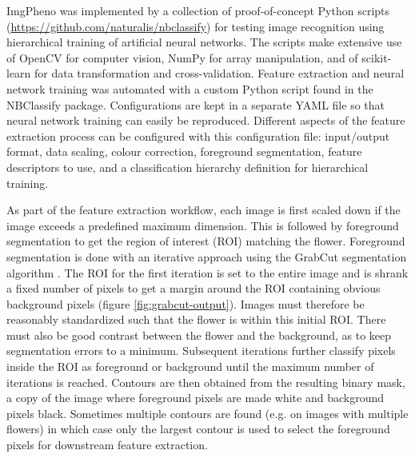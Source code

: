 \documentclass[3p,twocolumn,10pt]{elsarticle}
\begin{document}
ImgPheno was implemented by a collection of proof-of-concept Python scripts (\url{https://github.com/naturalis/nbclassify}) for testing image recognition using hierarchical training of artificial neural networks. The scripts make extensive use of OpenCV \citep{Pulli2012} for computer vision, NumPy \citep{VanderWalt2011} for array manipulation, and of scikit-learn \citep{Pedregosa2011} for data transformation and cross-validation. Feature extraction and neural network training was automated with a custom Python script found in the NBClassify package. Configurations are kept in a separate YAML file so that neural network training can easily be reproduced. Different aspects of the feature extraction process can be configured with this configuration file: input/output format, data scaling, colour correction, foreground segmentation, feature descriptors to use, and a classification hierarchy definition for hierarchical training.

As part of the feature extraction workflow, each image is first scaled down if the image exceeds a predefined maximum dimension. This is followed by foreground segmentation to get the region of interest (ROI) matching the flower. Foreground segmentation is done with an iterative approach using the GrabCut segmentation algorithm \citep{Rother2004}. The ROI for the first iteration is set to the entire image and is shrank a fixed number of pixels to get a margin around the ROI containing obvious background pixels (figure \ref{fig:grabcut-output}). Images must therefore be reasonably standardized such that the flower is within this initial ROI. There must also be good contrast between the flower and the background, as to keep segmentation errors to a minimum. Subsequent iterations further classify pixels inside the ROI as foreground or background until the maximum number of iterations is reached. Contours are then obtained from the resulting binary mask, a copy of the image where foreground pixels are made white and background pixels black. Sometimes multiple contours are found (e.g. on images with multiple flowers) in which case only the largest contour is used to select the foreground pixels for downstream feature extraction.
\end{document}
